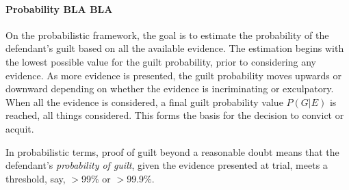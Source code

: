 \documentclass[10pt]{article}
\begin{document}
\paragraph{Probability BLA BLA}

 On the probabilistic framework, the goal is to estimate the probability of the defendant's guilt based 
 on all the available evidence. The estimation begins with the lowest possible value 
for the guilt probability, prior to considering any evidence. As more evidence is presented, the guilt probability 
moves upwards or downward depending on whether the evidence is incriminating or exculpatory. 
When all the evidence is considered, a final guilt probability value $P(G|E)$ is 
reached, all things considered. This forms the basis for 
the decision to convict or acquit. 

In probabilistic terms, proof of guilt beyond a reasonable doubt means 
that the defendant's \textit{probability of guilt}, given the evidence presented at trial, meets a 
threshold, say, $>$99\% or $>$99.9\%. 
%

\end{document}
